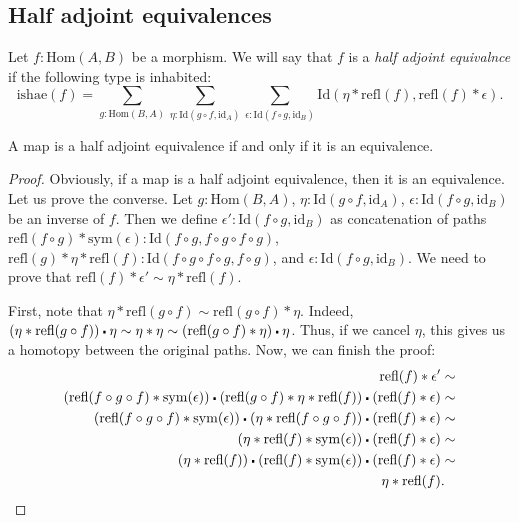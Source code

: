 \documentclass[reqno]{amsart}
\theoremstyle{definition}
\theoremstyle{remark}
\newcommand{\fs}[1]{\mathrm{#1}}
\newcommand{\Hom}{\fs{Hom}}
\newcommand{\Id}{\fs{Id}}
\newcommand{\refl}{\fs{refl}}
\newcommand{\sym}{\fs{sym}}
\newcommand{\id}{\fs{id}}
\numberwithin{figure}{section}
\newcommand{\ct}{%
  \mathchoice{\mathbin{\raisebox{0.25ex}{$\displaystyle\centerdot$}}}%
             {\mathbin{\raisebox{0.25ex}{$\centerdot$}}}%
             {\mathbin{\raisebox{0.25ex}{$\scriptstyle\,\centerdot\,$}}}%
             {\mathbin{\raisebox{0.25ex}{$\scriptscriptstyle\,\centerdot\,$}}}
}
\begin{document}
\subsection{Half adjoint equivalences}

Let $f : \Hom(A,B)$ be a morphism.
We will say that $f$ is a \emph{half adjoint equivalnce} if the following type is inhabited:
\[ \fs{ishae}(f) = \sum_{g : \Hom(B,A)} \sum_{\eta : \Id(g \circ f, \id_A)} \sum_{\epsilon : \Id(f \circ g, \id_B)} \Id(\eta * \refl(f), \refl(f) * \epsilon). \]

\begin{prop}
A map is a half adjoint equivalence if and only if it is an equivalence.
\end{prop}
\begin{proof}
Obviously, if a map is a half adjoint equivalence, then it is an equivalence.
Let us prove the converse.
Let $g : \Hom(B,A)$, $\eta : \Id(g \circ f, \id_A)$, $\epsilon : \Id(f \circ g, \id_B)$ be an inverse of $f$.
Then we define $\epsilon' : \Id(f \circ g, \id_B)$ as concatenation of paths
$\refl(f \circ g) * \sym(\epsilon) : \Id(f \circ g, f \circ g \circ f \circ g)$, $\refl(g) * \eta * \refl(f) : \Id(f \circ g \circ f \circ g, f \circ g)$, and $\epsilon : \Id(f \circ g, \id_B)$.
We need to prove that $\refl(f) * \epsilon' \sim \eta * \refl(f)$.

First, note that $\eta * \refl(g \circ f) \sim \refl(g \circ f) * \eta$.
Indeed, $(\eta * \refl(g \circ f)) \ct \eta \sim \eta * \eta \sim (\refl(g \circ f) * \eta) \ct \eta$.
Thus, if we cancel $\eta$, this gives us a homotopy between the original paths.
Now, we can finish the proof:
\begin{align*}
\refl(f) * \epsilon' & \sim \\
(\refl(f \circ g \circ f) * \sym(\epsilon)) \ct (\refl(g \circ f) * \eta * \refl(f)) \ct (\refl(f) * \epsilon) & \sim \\
(\refl(f \circ g \circ f) * \sym(\epsilon)) \ct (\eta * \refl(f \circ g \circ f)) \ct (\refl(f) * \epsilon) & \sim \\
(\eta * \refl(f) * \sym(\epsilon)) \ct (\refl(f) * \epsilon) & \sim \\
(\eta * \refl(f)) \ct (\refl(f) * \sym(\epsilon)) \ct (\refl(f) * \epsilon) & \sim \\
\eta * \refl(f) & .
\end{align*}
\end{proof}
\end{document}
